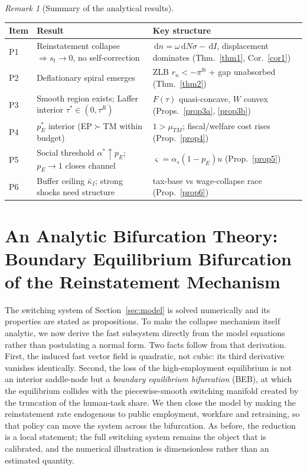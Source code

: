 \documentclass[review,12pt]{elsarticle}
\theoremstyle{plain}
\theoremstyle{definition}
\theoremstyle{remark}
\newtheorem{remark}[theorem]{Remark}
\newcommand{\dd}{\,\mathrm{d}}
\begin{document}
\begin{remark}[Summary of the analytical results]
\begin{center}
\small
\begin{tabular}{@{}>{\raggedright\arraybackslash}p{0.45in}>{\raggedright\arraybackslash}p{2.1in}>{\raggedright\arraybackslash}p{3.3in}@{}}\toprule
Item & Result & Key structure \\
\midrule
P1 & Reinstatement collapse $\Rightarrow s_t\to0$, no self-correction & $\dd n=\omega\dd N\sigma-\dd I$, displacement dominates (Thm.~\ref{thm1}, Cor.~\ref{cor1}) \\
P2 & Deflationary spiral emerges & ZLB $r_n<-\pi^{lb}$ + gap unabsorbed (Thm.~\ref{thm2}) \\
P3 & Smooth region exists; Laffer interior $\tau^*\in(0,\tau^R)$ & $F(\tau)$ quasi-concave, $W$ convex (Props.~\ref{prop3a}, \ref{prop3b}) \\
P4 & $p_E^*$ interior (EP$\succ$TM within budget) & $1>\mu_{TM}$; fiscal/welfare cost rises (Prop.~\ref{prop4}) \\
P5 & Social threshold $\alpha^*\uparrow p_E$; $p_E\to1$ closes channel & $\varsigma=\alpha_s(1-p_E)u$ (Prop.~\ref{prop5}) \\
P6 & Buffer ceiling $\bar\kappa_I$; strong shocks need structure & tax-base vs wage-collapse race (Prop.~\ref{prop6}) \\
\bottomrule
\end{tabular}
\end{center}
\end{remark}

\section{An Analytic Bifurcation Theory: Boundary Equilibrium Bifurcation of the Reinstatement Mechanism}
\label{sec:bifurcation}
The switching system of Section~\ref{sec:model} is solved numerically and its properties are stated as propositions. To make the collapse mechanism itself analytic, we now derive the fast subsystem directly from the model equations rather than postulating a normal form. Two facts follow from that derivation. First, the induced fast vector field is quadratic, not cubic: its third derivative vanishes identically. Second, the loss of the high-employment equilibrium is not an interior saddle-node but a \emph{boundary equilibrium bifurcation} (BEB), at which the equilibrium collides with the piecewise-smooth switching manifold created by the truncation of the human-task share. We then close the model by making the reinstatement rate endogenous to public employment, workfare and retraining, so that policy can move the system across the bifurcation. As before, the reduction is a local statement; the full switching system remains the object that is calibrated, and the numerical illustration is dimensionless rather than an estimated quantity.
\end{document}
